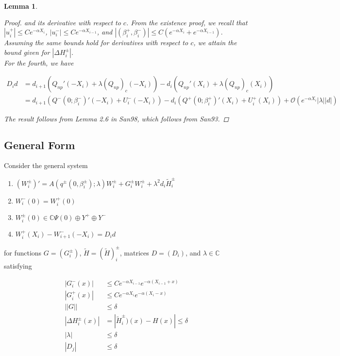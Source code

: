\documentclass[12pt]{article}
\def\C{{\mathbb C}}
\newtheorem{lemma}{Lemma}
\begin{document}
\begin{lemma}
\begin{proof}
and its derivative with respect to $c$. From the existence proof, we recall that $|u_i^+| \leq C e^{-\alpha X_i}$, $|u_i^-| \leq C e^{-\alpha X_{i-1}}$, and $|(\beta_i^+, \beta_i^-)| \leq C( e^{-\alpha X_i} + e^{-\alpha X_{i-1}})$. Assuming the same bounds hold for derivatives with respect to $c$, we attain the bound given for $|\Delta H_i^\pm|$.\\

For the fourth, we have

\begin{align*}
D_i d &= d_{i+1}(Q_{np}'(-X_i) + \lambda (Q_{np})_c(-X_i)) - d_i ( Q_{np}'(X_i) + \lambda (Q_{np})_c(X_i) ) \\
&= d_{i+1} (Q^-(0; \beta_i^-)'(-X_i) + U_i^-(-X_i)) - d_i (Q^+(0; \beta_i^+)'(X_i) + U_i^+(X_i)) + \mathcal{O}(e^{-\alpha X_i} |\lambda||d|)
\end{align*}

The result follows from Lemma 2.6 in San98, which follows from San93.

\end{proof}
\end{lemma}

\subsection{General Form}

Consider the general system

\begin{enumerate}
\item $(W_i^\pm)' = A(q^\pm(0, \beta_i^\pm); \lambda) W_i^\pm + G_i^\pm W_i^\pm + \lambda^2 d_i \tilde{H}_i^\pm$
\item $W_i^-(0) = W_i^+(0)$
\item $W_i^\pm(0) \in \C \Psi(0) \oplus Y^+ \oplus Y^- $
\item $W_i^+(X_i) - W_{i+1}^-(-X_i) = D_i d$
\end{enumerate}

for functions $G = (G_i^\pm)$, $\tilde{H} = (\tilde{H})_i^\pm$, matrices $D = (D_i)$, and $\lambda \in \C$ satisfying 

\begin{align}
|G_i^-(x)| &\leq C e^{-\alpha X_{i-1}} e^{-\alpha(X_{i-1} + x) } \\
|G_i^+(x)| &\leq C e^{-\alpha X_i} e^{-\alpha(X_i - x) } \\
||G|| &\leq \delta \\
|\Delta H_i^\pm(x)| &= |\tilde{H}_i^\pm)(x) - H(x)| \leq \delta \\
|\lambda| &\leq \delta \\
|D_j| &\leq \delta
\end{align}
\end{document}
